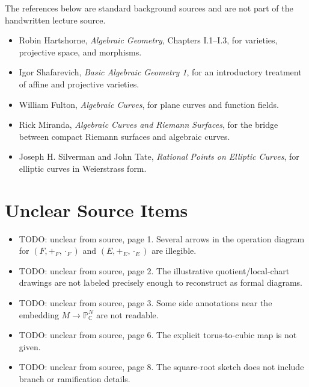 \documentclass[11pt]{article}
\theoremstyle{definition}
\theoremstyle{remark}
\newcommand{\C}{\mathbb{C}}
\newcommand{\Pj}{\mathbb{P}}
\begin{document}
The references below are standard background sources and are not part of the
handwritten lecture source.
\begin{itemize}
\item Robin Hartshorne, \emph{Algebraic Geometry}, Chapters I.1--I.3, for
varieties, projective space, and morphisms.
\item Igor Shafarevich, \emph{Basic Algebraic Geometry 1}, for an introductory
treatment of affine and projective varieties.
\item William Fulton, \emph{Algebraic Curves}, for plane curves and function
fields.
\item Rick Miranda, \emph{Algebraic Curves and Riemann Surfaces}, for the
bridge between compact Riemann surfaces and algebraic curves.
\item Joseph H. Silverman and John Tate, \emph{Rational Points on Elliptic
Curves}, for elliptic curves in Weierstrass form.
\end{itemize}

\section*{Unclear Source Items}

\begin{itemize}
\item TODO: unclear from source, page 1.  Several arrows in the operation
diagram for \((F,+_F,\cdot_F)\) and \((E,+_E,\cdot_E)\) are illegible.
\item TODO: unclear from source, page 2.  The illustrative quotient/local-chart
drawings are not labeled precisely enough to reconstruct as formal diagrams.
\item TODO: unclear from source, page 3.  Some side annotations near the
embedding \(M\to\Pj^N_{\C}\) are not readable.
\item TODO: unclear from source, page 6.  The explicit torus-to-cubic map is
not given.
\item TODO: unclear from source, page 8.  The square-root sketch does not
include branch or ramification details.
\end{itemize}
\end{document}
